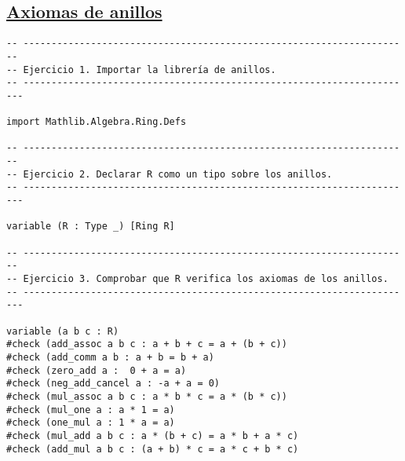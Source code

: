 \subsection{\href{./src/Basicos/Axiomas\_de\_anillos.lean}{Axiomas de anillos}}
\label{sec:orgd4faec0}
\begin{verbatim}
-- ---------------------------------------------------------------------
-- Ejercicio 1. Importar la librería de anillos.
-- ----------------------------------------------------------------------

import Mathlib.Algebra.Ring.Defs

-- ---------------------------------------------------------------------
-- Ejercicio 2. Declarar R como un tipo sobre los anillos.
-- ----------------------------------------------------------------------

variable (R : Type _) [Ring R]

-- ---------------------------------------------------------------------
-- Ejercicio 3. Comprobar que R verifica los axiomas de los anillos.
-- ----------------------------------------------------------------------

variable (a b c : R)
#check (add_assoc a b c : a + b + c = a + (b + c))
#check (add_comm a b : a + b = b + a)
#check (zero_add a :  0 + a = a)
#check (neg_add_cancel a : -a + a = 0)
#check (mul_assoc a b c : a * b * c = a * (b * c))
#check (mul_one a : a * 1 = a)
#check (one_mul a : 1 * a = a)
#check (mul_add a b c : a * (b + c) = a * b + a * c)
#check (add_mul a b c : (a + b) * c = a * c + b * c)
\end{verbatim}

